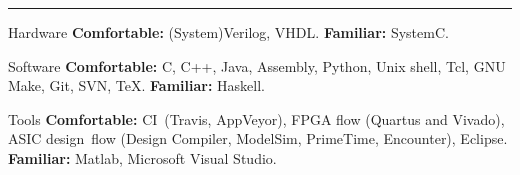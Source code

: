\vspace{-3mm}
\rule{\textwidth}{0.5pt}\vspace{-1mm}

\vspace{-1mm}
\begin{cvskills}

\cvskill
{Hardware}
{\textbf{Comfortable:} (System)Verilog, VHDL. \textbf{Familiar:} 
SystemC.}

\cvskill
{Software}
{\textbf{Comfortable:} C, C++, Java, Assembly, Python, Unix shell, Tcl, 
GNU Make, Git, SVN, \TeX. \textbf{Familiar:} Haskell.}

\cvskill
{Tools}
{\textbf{Comfortable:} CI~(Travis, AppVeyor), FPGA flow (Quartus and Vivado), 
ASIC design~flow (Design Compiler, ModelSim, PrimeTime, Encounter), Eclipse. 
\textbf{Familiar:} Matlab, Microsoft Visual Studio.}

\end{cvskills}

